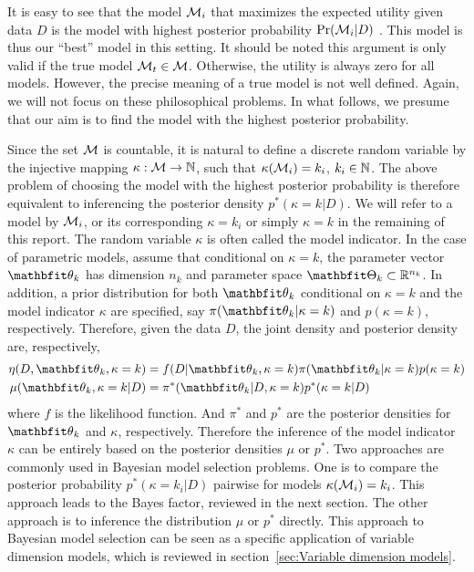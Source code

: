 It is easy to see that the model $\mathcal{M}_i$ that maximizes the expected utility
given data $D$ is the model with highest posterior probability
$\Pr(\mathcal{M}_i|D)$ \parencite[see][chap.~6]{Bernardo2000}. This model is thus
our ``best'' model in this setting. It should be noted this argument is only
valid if the true model $\mathcal{M}_t \in \mathcal{M}$. Otherwise, the utility is always
zero for all models. However, the precise meaning of a true model is not well
defined.  Again, we will not focus on these philosophical problems. In what
follows, we presume that our aim is to find the model with the highest
posterior probability.

Since the set $\mathcal{M}$ is countable, it is natural to define a discrete random
variable by the injective mapping $\kappa:\mathcal{M}\to\mathbb{N}$, such that
$\kappa(\mathcal{M}_i) = k_i$, $k_i \in \mathbb{N}$. The above problem of choosing the
model with the highest posterior probability is therefore equivalent to
inferencing the posterior density $p^*(\kappa = k|D)$. We will refer to a
model by $\mathcal{M}_i$, or its corresponding $\kappa = k_i$ or simply $\kappa = k$
in the remaining of this report. The random variable $\kappa$ is often called
the model indicator. In the case of parametric models, assume that conditional
on $\kappa = k$, the parameter vector $\bth_k$ has dimension $n_k$ and
parameter space $\bTh_k\subset\bbR^{n_k}$. In addition, a prior distribution
for both $\bth_k$ conditional on $\kappa = k$ and the model indicator $\kappa$
are specified, say $\pi(\bth_k|\kappa =k)$ and $p(\kappa = k)$, respectively.
Therefore, given the data $D$, the joint density and posterior density are,
respectively,
\begin{align}
  \eta(D,\bth_k,\kappa=k)
  &= f(D|\bth_k,\kappa=k)\pi(\bth_k|\kappa=k)p(\kappa=k)
  \label{eq:full joint}\\
  \mu(\bth_k,\kappa=k|D)
  &= \pi^*(\bth_k|D,\kappa=k)p^*(\kappa=k|D)
  \label{eq:full posterior}
\end{align}
where $f$ is the likelihood function. And $\pi^*$ and $p^*$ are the posterior
densities for $\bth_k$ and $\kappa$, respectively. Therefore the inference of
the model indicator $\kappa$ can be entirely based on the posterior densities
$\mu$ or $p^*$. Two approaches are commonly used in Bayesian model selection
problems. One is to compare the posterior probability $p^*(\kappa=k_i|D)$
pairwise for models $\kappa(\mathcal{M}_i) = k_i$. This approach leads to the Bayes
factor, reviewed in the next section. The other approach is to inference the
distribution $\mu$ or $p^*$ directly. This approach to Bayesian model
selection can be seen as a specific application of variable dimension models,
which is reviewed in section~\ref{sec:Variable dimension models}.

